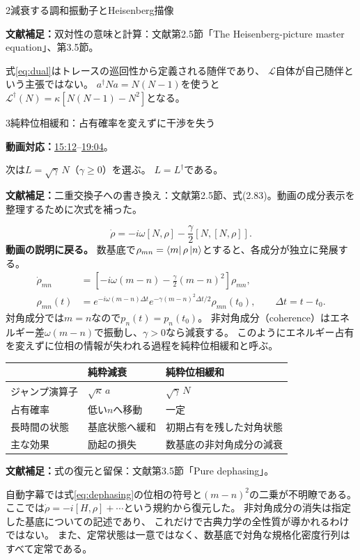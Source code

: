 \documentclass[a4paper,11pt]{ltjsarticle}
\numberwithin{equation}{section}
\newcommand{\video}[2]{\href{https://www.youtube.com/watch?v=RYxzcUhIHjk\&t=#1s}{#2}}
\newcommand{\videosource}[1]{\par\noindent\textcolor{noteblue}{\textbf{動画対応：}#1}\par\smallskip}
\newcommand{\supplement}[1]{\par\medskip\noindent\textcolor{notered}{\textbf{文献補足：}}#1\par\smallskip}
\begin{document}
\begin{lecturesection}{2}{減衰する調和振動子とHeisenberg描像}
\supplement{双対性の意味と計算：文献\cite{Pajer:2026fuo}第2.5節「The Heisenberg-picture master equation」、第3.5節。}
式\eqref{eq:dual}はトレースの巡回性から定義される随伴であり、
$\mathcal L$自体が自己随伴という主張ではない。
$a^\dagger Na=N(N-1)$を使うと$\mathcal L^\dagger(N)=\kappa[N(N-1)-N^2]$となる。
\end{lecturesection}

\begin{lecturesection}{3}{純粋位相緩和：占有確率を変えずに干渉を失う}
\label{sec:dephasing}
\videosource{\video{912}{15:12}--\video{1144}{19:04}。}
次は$L=\sqrt\gamma\,N$（$\gamma\ge0$）を選ぶ。
$L=L^\dagger$である。
\supplement{二重交換子への書き換え：文献\cite{Pajer:2026fuo}第2.5節、式(2.83)。動画の成分表示を整理するために次式を補った。}
\begin{equation}
 \dot\rho=-i\omega[N,\rho]-\frac\gamma2[N,[N,\rho]].
\end{equation}
\noindent\textcolor{noteblue}{\textbf{動画の説明に戻る。}}
数基底で$\rho_{mn}=\bra m\rho\ket n$とすると、各成分が独立に発展する。
\begin{align}
 \dot\rho_{mn}
  &=\left[-i\omega(m-n)-\frac\gamma2(m-n)^2\right]\rho_{mn},\\
 \rho_{mn}(t)
  &=e^{-i\omega(m-n)\Delta t}
    e^{-\gamma(m-n)^2\Delta t/2}\rho_{mn}(t_0),
 \qquad\Delta t=t-t_0.
 \label{eq:dephasing}
\end{align}
対角成分では$m=n$なので$p_n(t)=p_n(t_0)$。
非対角成分（coherence）はエネルギー差$\omega(m-n)$で振動し、$\gamma>0$なら減衰する。
このようにエネルギー占有を変えずに位相の情報が失われる過程を純粋位相緩和と呼ぶ。

\begin{center}
\begin{tabular}{lll}\toprule
 & 純粋減衰 & 純粋位相緩和\\\midrule
ジャンプ演算子 & $\sqrt\kappa\,a$ & $\sqrt\gamma\,N$\\
占有確率 & 低い$n$へ移動 & 一定\\
長時間の状態 & 基底状態へ緩和 & 初期占有を残した対角状態\\
主な効果 & 励起の損失 & 数基底の非対角成分の減衰\\\bottomrule
\end{tabular}
\end{center}

\supplement{式の復元と留保：文献\cite{Pajer:2026fuo}第3.5節「Pure dephasing」。}
自動字幕では式\eqref{eq:dephasing}の位相の符号と$(m-n)^2$の二乗が不明瞭である。
ここでは$\dot\rho=-i[H,\rho]+\cdots$という規約から復元した。
非対角成分の消失は指定した基底についての記述であり、
これだけで古典力学の全性質が導かれるわけではない。
また、定常状態は一意ではなく、数基底で対角な規格化密度行列はすべて定常である。
\end{lecturesection}
\end{document}
